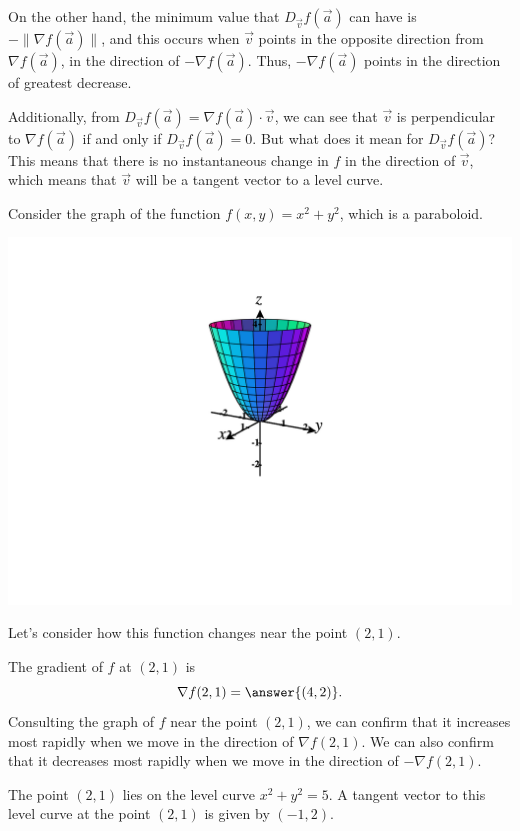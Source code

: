 \documentclass{ximera}
\begin{document}
On the other hand, the minimum value that $D_{\vec{v}}f(\vec{a})$ can have is $-\|\nabla f(\vec{a})\|$, and this occurs when $\vec{v}$ points in the opposite direction from $\nabla f(\vec{a})$, in the direction of $-\nabla f(\vec{a})$. Thus, $-\nabla f(\vec{a})$ points in the direction of greatest decrease.

Additionally, from $D_{\vec{v}}f(\vec{a}) = \nabla f(\vec{a})\cdot \vec{v}$, we can see that  $\vec{v}$ is perpendicular to $\nabla f(\vec{a})$ if and only if $D_{\vec{v}}f(\vec{a})=0$. But what does it mean for $D_{\vec{v}}f(\vec{a})$? This means that there is no instantaneous change in $f$ in the direction of $\vec{v}$, which means that $\vec{v}$ will be a tangent vector to a level curve.

\begin{example}
Consider the graph of the function $f(x,y) = x^2+y^2$, which is a paraboloid.

\begin{image}
\includegraphics[width = \textwidth]{CalcPlot3d-paraboloid}
\end{image}

Let's consider how this function changes near the point $(2,1)$.

The gradient of $f$ at $(2,1)$ is
\[
\nabla f(2,1) = \answer{(4,2)}.
\]
Consulting the graph of $f$ near the point $(2,1)$, we can confirm that it increases most rapidly when we move in the direction of $\nabla f(2,1)$. We can also confirm that it decreases most rapidly when we move in the direction of $-\nabla f(2,1)$.

The point $(2,1)$ lies on the level curve $x^2 + y^2 = 5$. A tangent vector to this level curve at the point $(2,1)$ is given by $(-1, 2)$.


\end{example}
\end{document}
